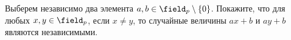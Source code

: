 Выберем независимо два элемента $a, b \in \field_p \setminus \{0\}$. Покажите, что для любых
$x, y \in \field_p$, если $x \neq y$, то случайные величины $ax + b$ и $ay + b$ являются независимыми.
